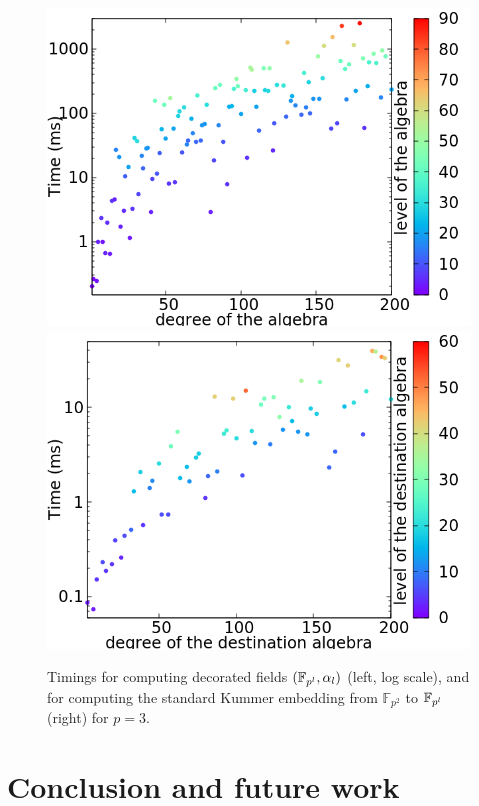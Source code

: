 \documentclass[sigconf]{acmart}
\begin{document}
\begin{figure}[h]
  \centering
  \includegraphics[scale=.24]{solve_h90-3.png}
  \includegraphics[scale=.24]{embed-3.png}
  \caption{Timings for computing decorated fields
    $(\mathbb{F}_{p^l},\alpha_l)$ (left, log scale), and for computing the
    standard Kummer embedding from $\mathbb{F}_{p^2}$ to $\mathbb{F}_{p^l}$
    (right) for $p=3$.}
  \label{fig:timings}
\end{figure}

\section{Conclusion and future work}
\label{sec:conclusion}
\end{document}
